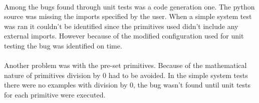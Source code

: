 \paragraph{}
Among the bugs found through unit tests was a code generation one. The python source was missing the imports specified by the user. When a simple system
test was ran it couldn't be identified since the primitives used didn't include any external imports. However because of the modified configuration used
for unit testing the bug was identified on time.
\paragraph{}
Another problem was with the pre-set primitives. Because of the mathematical nature of primitives division by 0 had to be avoided.
In the simple system tests there were no examples with division by 0, the bug wasn't found until unit tests
for each primitive were executed.